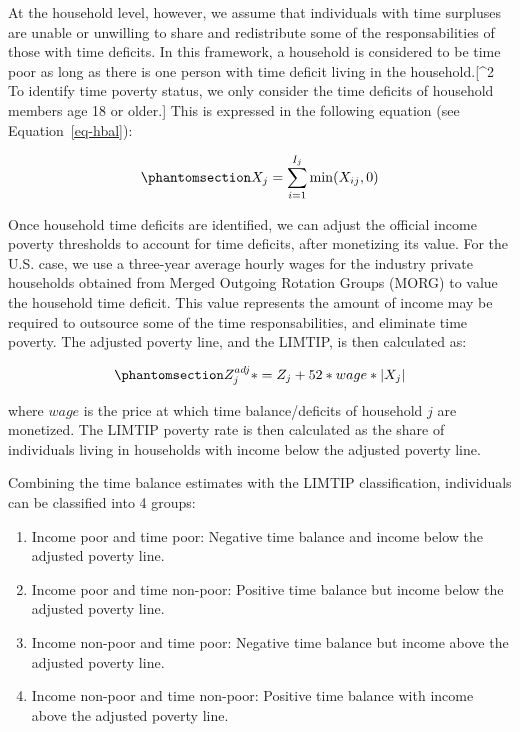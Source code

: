 \documentclass[
  11pt,
]{article}
\providecommand{\tightlist}{%
  \setlength{\itemsep}{0pt}\setlength{\parskip}{0pt}}\usepackage{longtable,booktabs,array}
\begin{document}
At the household level, however, we assume that individuals with time
surpluses are unable or unwilling to share and redistribute some of the
responsabilities of those with time deficits. In this framework, a
household is considered to be time poor as long as there is one person
with time deficit living in the household.{[}\^{}2 To identify time
poverty status, we only consider the time deficits of household members
age 18 or older.{]} This is expressed in the following equation (see
Equation~\ref{eq-hbal}):

\begin{equation}\phantomsection\label{eq-hbal}{X_{j} = \sum_{i=1}^{I_j} \min(X_{ij},0)
}\end{equation}

Once household time deficits are identified, we can adjust the official
income poverty thresholds to account for time deficits, after monetizing
its value. For the U.S. case, we use a three-year average hourly wages
for the industry private households obtained from Merged Outgoing
Rotation Groups (MORG) to value the household time deficit. This value
represents the amount of income may be required to outsource some of the
time responsabilities, and eliminate time poverty. The adjusted poverty
line, and the LIMTIP, is then calculated as:

\begin{equation}\phantomsection\label{eq-limtip}{Z_{j}^{adj}* = Z_{j} + 52*wage* |X_{j}|
}\end{equation}

where \(wage\) is the price at which time balance/deficits of household
\({j}\) are monetized. The LIMTIP poverty rate is then calculated as the
share of individuals living in households with income below the adjusted
poverty line.

Combining the time balance estimates with the LIMTIP classification,
individuals can be classified into 4 groups:

\begin{enumerate}
\def\labelenumi{\arabic{enumi}.}
\tightlist
\item
  Income poor and time poor: Negative time balance and income below the
  adjusted poverty line.
\item
  Income poor and time non-poor: Positive time balance but income below
  the adjusted poverty line.
\item
  Income non-poor and time poor: Negative time balance but income above
  the adjusted poverty line.
\item
  Income non-poor and time non-poor: Positive time balance with income
  above the adjusted poverty line.
\end{enumerate}
\end{document}
